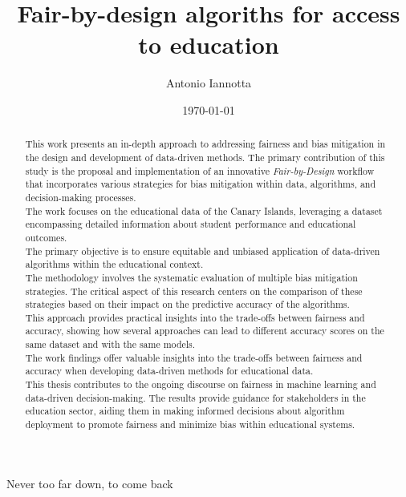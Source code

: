 \documentclass[12pt,a4paper,openright,twoside]{book}
\title{Fair-by-design algoriths for access to education}
\author{Antonio Iannotta}
\date{\today}
\begin{document}
	
\frontmatter



\begin{abstract}

    This work presents an in-depth approach to addressing fairness and bias mitigation in the design and development of data-driven methods. The primary contribution of this study is the proposal and implementation of an innovative \emph{Fair-by-Design} workflow that incorporates various strategies for bias mitigation within data, algorithms, and decision-making processes. \\
    The work focuses on the educational data of the Canary Islands, leveraging a dataset encompassing detailed information about student performance and educational outcomes. \\
    The primary objective is to ensure equitable and unbiased application of data-driven algorithms within the educational context. \\
    The methodology involves the systematic evaluation of multiple bias mitigation strategies. The critical aspect of this research centers on the comparison of these strategies based on their impact on the predictive accuracy of the algorithms. \\ 
    This approach provides practical insights into the trade-offs between fairness and accuracy, showing how several approaches can lead to different accuracy scores on the same dataset and with the same models. \\
    The work findings offer valuable insights into the trade-offs between fairness and accuracy when developing data-driven methods for educational data. \\
    This thesis contributes to the ongoing discourse on fairness in machine learning and data-driven decision-making. The results provide guidance for stakeholders in the education sector, aiding them in making informed decisions about algorithm deployment to promote fairness and minimize bias within educational systems. \\

\end{abstract}
    


\begin{acknowledgements} %
Never too far down, to come back
\end{acknowledgements}

\tableofcontents   
\end{document}
